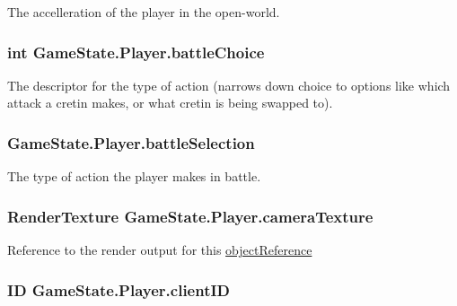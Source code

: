 The accelleration of the player in the open-\/world. 

\hypertarget{class_game_state_1_1_player_a3bfa8ea6e2067982474dc4f6073061c5}{
\subsubsection[{battle\-Choice}]{\setlength{\rightskip}{0pt plus 5cm}int Game\-State.\-Player.\-battle\-Choice}}\label{class_game_state_1_1_player_a3bfa8ea6e2067982474dc4f6073061c5}


The descriptor for the type of action (narrows down choice to options like which attack a cretin makes, or what cretin is being swapped to). 

\hypertarget{class_game_state_1_1_player_a123c8ee2ef6e66e88bcca1a80f73ab4a}{
\subsubsection[{battle\-Selection}]{ Game\-State.\-Player.\-battle\-Selection}}\label{class_game_state_1_1_player_a123c8ee2ef6e66e88bcca1a80f73ab4a}


The type of action the player makes in battle. 

\hypertarget{class_game_state_1_1_player_ac1f7e0b5bc335c32c3be71e3653787a6}{
\subsubsection[{camera\-Texture}]{\setlength{\rightskip}{0pt plus 5cm}Render\-Texture Game\-State.\-Player.\-camera\-Texture}}\label{class_game_state_1_1_player_ac1f7e0b5bc335c32c3be71e3653787a6}


Reference to the render output for this \hyperlink{class_game_state_1_1_player_aebf24de01e14055dc940d0493753484f}{object\-Reference} 

\hypertarget{class_game_state_1_1_player_aacc123df8ea5256f83c1060a5fdd19c2}{
\subsubsection[{client\-I\-D}]{\setlength{\rightskip}{0pt plus 5cm}I\-D Game\-State.\-Player.\-client\-I\-D}}\label{class_game_state_1_1_player_aacc123df8ea5256f83c1060a5fdd19c2}


